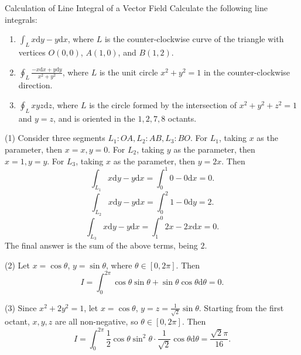\begin{example}{Calculation of Line Integral of a Vector Field}{}
  Calculate the following line integrals:
  \begin{enumerate}
  \item $\int_L x\mathrm{d} y - y\mathrm{d} x$, where $L$ is the
    counter-clockwise curve of the triangle with vertices $O(0, 0)$,
    $A(1, 0)$, and $B(1, 2)$.
  \item $\oint_L \frac{-x \mathrm{d} x + y\mathrm{d} y}{x^2 + y^2}$,
    where $L$ is the unit circle $x^2 + y^2 = 1$ in the counter-clockwise direction.
  \item $\oint_L xyz\mathrm{d}z$, where $L$ is the circle formed by
    the intersection of $x^2 + y^2 + z^2 = 1$ and $y = z$,
    and is oriented in the $1,2,7,8$ octants.
  \end{enumerate}
\end{example}

\begin{solution}
  (1) Consider three segments $L_1: OA, L_2:AB, L_3:BO$.
  For $L_1$, taking $x$ as the parameter, then $x = x, y = 0$.
  For $L_2$, taking $y$ as the parameter, then $x = 1, y = y$.
  For $L_3$, taking $x$ as the parameter, then $y = 2x$.
  Then
  \begin{equation}
    \int_{L_1} x\mathrm{d} y - y\mathrm{d} x = \int_0^1 0 - 0\mathrm{d}x = 0.
  \end{equation}
  \begin{equation}
    \int_{L_2} x\mathrm{d} y - y\mathrm{d} x = \int_0^2 1 - 0 \mathrm{d}y = 2.
  \end{equation}
  \begin{equation}
    \int_{L_3} x\mathrm{d} y - y\mathrm{d} x = \int_1^0 2x - 2x\mathrm{d} x = 0.
  \end{equation}
  The final answer is the sum of the above terms, being $2$.

  (2) Let $x = \cos \theta$, $y = \sin \theta$, where $\theta \in [0, 2\pi]$.
  Then
  \begin{equation}
    I = \int_0^{2\pi} \cos \theta \sin \theta + \sin \theta \cos \theta \mathrm{d} \theta = 0.
  \end{equation}

  (3) Since $x^2 + 2y^2 = 1$, let $x = \cos \theta$, $y = z =
  \frac{1}{\sqrt{2}}\sin \theta$.
  Starting from the first octant, $x, y, z$ are all non-negative, so $\theta \in
  [0, 2\pi]$. Then
  \begin{equation}
    I = \int_0^{2\pi} \frac{1}{2} \cos \theta \sin^2 \theta \cdot \frac{1}{\sqrt{2}} \cos \theta \mathrm{d} \theta =
    \frac{\sqrt{2}\pi}{16}.
  \end{equation}
\end{solution}

